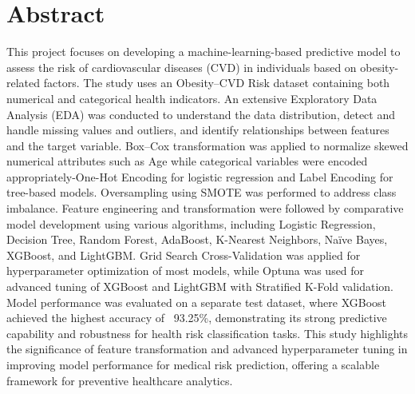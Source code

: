 \chapter{Abstract}\label{ch:abstract}


This project focuses on developing a machine-learning-based predictive model to assess the risk of cardiovascular diseases (CVD) in individuals based on obesity-related factors.
The study uses an Obesity–CVD Risk dataset containing both numerical and categorical health indicators.
An extensive Exploratory Data Analysis (EDA) was conducted to understand the data distribution, detect and handle missing values and outliers, and identify relationships between features and the target variable.
Box–Cox transformation was applied to normalize skewed numerical attributes such as Age while categorical variables were encoded appropriately-One-Hot Encoding for logistic regression and Label Encoding for tree-based models.
Oversampling using SMOTE was performed to address class imbalance.
Feature engineering and transformation were followed by comparative model development using various algorithms, including Logistic Regression, Decision Tree, Random Forest, AdaBoost, K-Nearest Neighbors, Naïve Bayes, XGBoost, and LightGBM. Grid Search Cross-Validation was applied for hyperparameter optimization of most models, while Optuna was used for advanced tuning of XGBoost and LightGBM with Stratified K-Fold validation.
Model performance was evaluated on a separate test dataset, where XGBoost achieved the highest accuracy of ~93.25\%, demonstrating its strong predictive capability and robustness for health risk classification tasks.
This study highlights the significance of feature transformation and advanced hyperparameter tuning in improving model performance for medical risk prediction, offering a scalable framework for preventive healthcare analytics.
